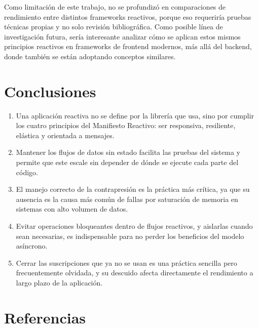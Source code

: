 \documentclass[12pt,letterpaper]{article}
\begin{document}
Como limitación de este trabajo, no se profundizó en comparaciones de rendimiento entre distintos frameworks reactivos, porque eso requeriría pruebas técnicas propias y no solo revisión bibliográfica. Como posible línea de investigación futura, sería interesante analizar cómo se aplican estos mismos principios reactivos en frameworks de frontend modernos, más allá del backend, donde también se están adoptando conceptos similares.

\section*{Conclusiones}

\begin{enumerate}[label=\arabic*., leftmargin=*]
\item Una aplicación reactiva no se define por la librería que usa, sino por cumplir los cuatro principios del Manifiesto Reactivo: ser responsiva, resiliente, elástica y orientada a mensajes.
\item Mantener los flujos de datos sin estado facilita las pruebas del sistema y permite que este escale sin depender de dónde se ejecute cada parte del código.
\item El manejo correcto de la contrapresión es la práctica más crítica, ya que su ausencia es la causa más común de fallas por saturación de memoria en sistemas con alto volumen de datos.
\item Evitar operaciones bloqueantes dentro de flujos reactivos, y aislarlas cuando sean necesarias, es indispensable para no perder los beneficios del modelo asíncrono.
\item Cerrar las suscripciones que ya no se usan es una práctica sencilla pero frecuentemente olvidada, y su descuido afecta directamente el rendimiento a largo plazo de la aplicación.
\end{enumerate}

\section*{Referencias}
\end{document}
